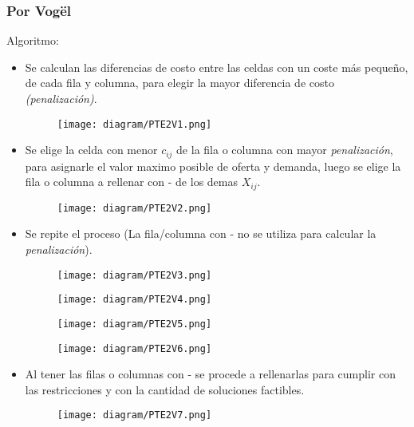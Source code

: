 \documentclass{templateNote}
\begin{document}
\newpage
\subsubsection*{Por Vogël}
Algoritmo:
\begin{itemize}
    \item Se calculan las diferencias de costo entre las celdas con un coste más pequeño, de cada fila y columna, para elegir la mayor diferencia de costo \textit{(penalización)}.
    \begin{figure}[H]
        \centering
        \texttt{[image: diagram/PTE2V1.png]}
    \end{figure}

    \item Se elige la celda con menor $c_{ij}$ de la fila o columna con mayor \textit{penalización}, para asignarle el valor maximo posible de oferta y demanda, luego se elige la fila o columna a rellenar con - de los demas $X_{ij}$.
    \begin{figure}[H]
        \centering
        \texttt{[image: diagram/PTE2V2.png]}
    \end{figure}

    \item Se repite el proceso (La fila/columna con - no se utiliza para calcular la \textit{penalización}).
    \begin{figure}[H]
        \centering
        \texttt{[image: diagram/PTE2V3.png]}
    \end{figure}

    \begin{figure}[H]
        \centering
        \texttt{[image: diagram/PTE2V4.png]}
    \end{figure}

    \begin{figure}[H]
        \centering
        \texttt{[image: diagram/PTE2V5.png]}
    \end{figure}

    \begin{figure}[H]
        \centering
        \texttt{[image: diagram/PTE2V6.png]}
    \end{figure}

    \newpage
    \item Al tener las filas o columnas con - se procede a rellenarlas para cumplir con las restricciones y con la cantidad de soluciones factibles.
    \begin{figure}[H]
        \centering
        \texttt{[image: diagram/PTE2V7.png]}
    \end{figure}


\end{itemize}
\end{document}
